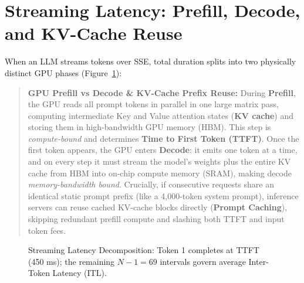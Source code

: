 \section{Streaming Latency: Prefill, Decode, and KV-Cache Reuse}

When an LLM streams tokens over SSE, total duration splits into two physically distinct GPU phases (Figure~\ref{fig:v2-ch07-ttft}):

\begin{quote}
\textbf{GPU Prefill vs Decode \& KV-Cache Prefix Reuse:} During \textbf{Prefill}, the GPU reads all prompt tokens in parallel in one large matrix pass, computing intermediate Key and Value attention states (\textbf{KV cache}) and storing them in high-bandwidth GPU memory (HBM). This step is \emph{compute-bound} and determines \textbf{Time to First Token (TTFT)}. Once the first token appears, the GPU enters \textbf{Decode}: it emits one token at a time, and on every step it must stream the model's weights plus the entire KV cache from HBM into on-chip compute memory (SRAM), making decode \emph{memory-bandwidth bound}. Crucially, if consecutive requests share an identical static prompt prefix (like a 4,000-token system prompt), inference servers can reuse cached KV-cache blocks directly (\textbf{Prompt Caching}), skipping redundant prefill compute and slashing both TTFT and input token fees.
\end{quote}

\begin{figure}[htbp]
\centering
{}
\caption{Streaming Latency Decomposition: Token 1 completes at TTFT (450 ms); the remaining $N - 1 = 69$ intervals govern average Inter-Token Latency (ITL).}
\label{fig:v2-ch07-ttft}
\end{figure}

